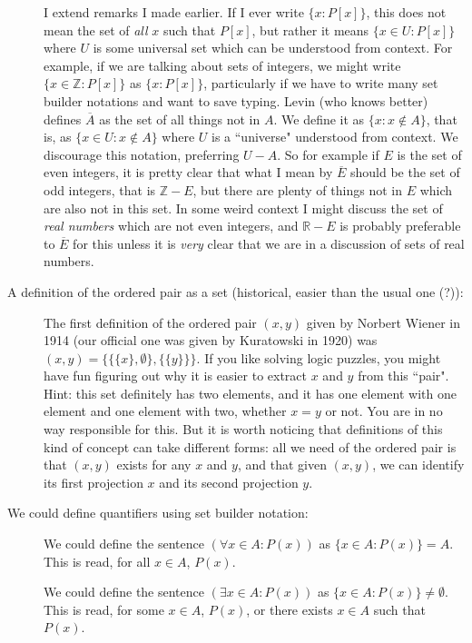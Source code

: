 \documentclass[12pt]{article}
\begin{document}
\begin{description}
I extend remarks I made earlier.  If I ever write $\{x:P[x]\}$, this does not mean the set of {\em all\/} $x$ such that $P[x]$, but rather it means $\{x\in U:P[x]\}$  where $U$ is some universal set which can be understood from context.  For example, if we are talking about sets of integers, we might write $\{x\in \mathbb Z:P[x]\}$ as $\{x:P[x]\}$, particularly if we have to write many set builder notations and want to save typing.
Levin (who knows better) defines $\overline{A}$ as the set of all things not in $A$.  We define it as $\{x:x \not\in A\}$, that is, as $\{x\in U:x \not\in A\}$ where $U$ is a ``universe" understood from context.
We discourage this notation, preferring $U - A$.  So for example if $E$ is the set of even integers, it is pretty clear that what I mean by $\overline{E}$ should be the set of odd integers, that is $\mathbb Z - E$, but there are plenty of things not in $E$ which are also not in this set.  In some weird context I might discuss the set of {\em real numbers\/} which are not even integers, and $\mathbb R - E$ is probably preferable to $\overline{E}$ for this unless it is {\em very\/} clear that we are in a discussion of sets of real numbers.


\item[A definition of the ordered pair as a set (historical, easier than the usual one (?)):]

The first definition of the ordered pair $(x,y)$ given by Norbert Wiener in 1914 (our official one was given by Kuratowski in 1920) was $(x,y) = \{\{\{x\},\emptyset\},\{\{y\}\}\}$.  If you like solving logic puzzles, you might have fun figuring out why it is easier to extract $x$ and $y$ from this ``pair".  Hint:  this set definitely has two elements, and it has one element with one element and one element with two, whether $x=y$ or not.  You are in no way responsible for this.  But it is worth noticing that definitions of this kind of concept can take different forms:  all we need of the ordered pair is that $(x,y)$ exists for any $x$ and $y$, and that given $(x,y)$, we can identify its first projection $x$ and its second projection $y$.

\item[We could define quantifiers using set builder notation:]

We could define the sentence $(\forall x \in A:P(x))$ as $\{x \in A:P(x)\} = A$.  This is read, for all $x \in A$, $P(x)$.

We could define the sentence $(\exists x \in A:P(x))$ as $\{x \in A:P(x)\} \neq \emptyset$.  This is read, for some $x \in A$, $P(x)$, or there exists $x \in A$ such that $P(x)$.


\end{description}
\end{document}
